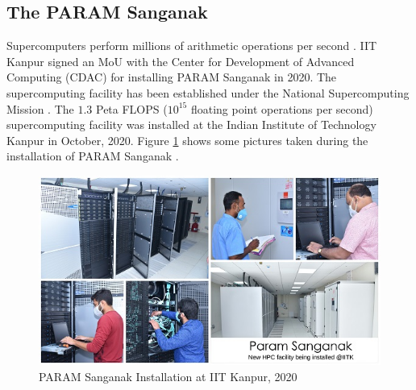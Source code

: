\subsection{The PARAM Sanganak}

Supercomputers perform millions of arithmetic operations per second \cite{supercomputers1982}.
IIT Kanpur signed an MoU with the Center for Development of Advanced Computing (CDAC) for installing PARAM Sanganak in 2020.
The supercomputing facility has been established under the National Supercomputing Mission \cite{nsm}.
The $1.3$ Peta FLOPS ($10^{15}$ floating point operations per second) supercomputing facility was installed at the Indian Institute of Technology Kanpur in October, 2020. 
Figure \ref{fig:param} shows some pictures taken during the installation of PARAM Sanganak \cite{paramsanganak}.


\begin{figure}[h]
\centering
\includegraphics[scale=2]{param_sanganak.jpg}
\caption{PARAM Sanganak Installation at IIT Kanpur, 2020}
\label{fig:param}
\end{figure}


